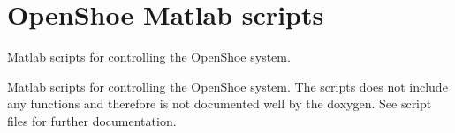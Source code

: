 \hypertarget{group__os__matlab__scripts}{
\section{\-Open\-Shoe \-Matlab scripts}
\label{group__os__matlab__scripts}
}


\-Matlab scripts for controlling the \-Open\-Shoe system.  


\-Matlab scripts for controlling the \-Open\-Shoe system. \-The scripts does not include any functions and therefore is not documented well by the doxygen. \-See script files for further documentation. 